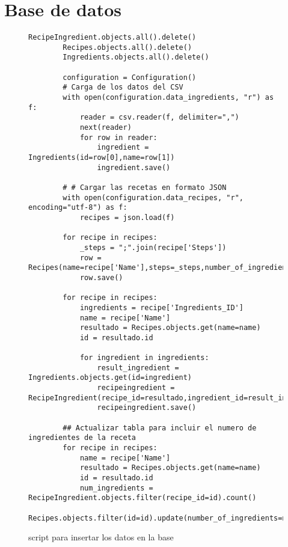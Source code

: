 \chapter{Base de datos}
\begin{figure}[H]
    \begin{lstlisting}[style=python]
        RecipeIngredient.objects.all().delete()
        Recipes.objects.all().delete()
        Ingredients.objects.all().delete()
        
        configuration = Configuration()
        # Carga de los datos del CSV
        with open(configuration.data_ingredients, "r") as f:
            reader = csv.reader(f, delimiter=",")
            next(reader)
            for row in reader:
                ingredient = Ingredients(id=row[0],name=row[1])
                ingredient.save()
        
        # # Cargar las recetas en formato JSON
        with open(configuration.data_recipes, "r", encoding="utf-8") as f:
            recipes = json.load(f)
        
        for recipe in recipes:
            _steps = ";".join(recipe['Steps'])
            row = Recipes(name=recipe['Name'],steps=_steps,number_of_ingredients=None)
            row.save()
        
        for recipe in recipes:
            ingredients = recipe['Ingredients_ID']
            name = recipe['Name']
            resultado = Recipes.objects.get(name=name)
            id = resultado.id
        
            for ingredient in ingredients:
                result_ingredient = Ingredients.objects.get(id=ingredient)
                recipeingredient = RecipeIngredient(recipe_id=resultado,ingredient_id=result_ingredient)
                recipeingredient.save()
        
        ## Actualizar tabla para incluir el numero de ingredientes de la receta
        for recipe in recipes:
            name = recipe['Name']
            resultado = Recipes.objects.get(name=name)
            id = resultado.id
            num_ingredients = RecipeIngredient.objects.filter(recipe_id=id).count()
            Recipes.objects.filter(id=id).update(number_of_ingredients=num_ingredients)
    \end{lstlisting}
    \caption{\Gls{script} para insertar los datos en la \gls{base}}
    \label{sni:insertar}
\end{figure}

